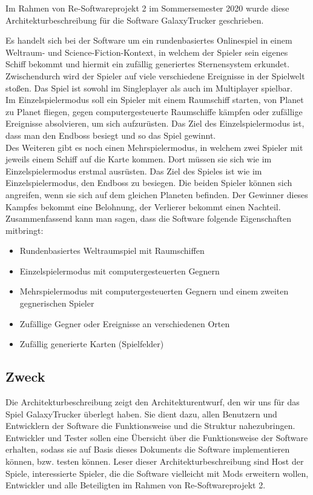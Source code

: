 \documentclass[fontsize=12pt,paper=a4,twoside]{scrartcl}
\begin{document}
Im Rahmen von Re-Softwareprojekt 2 im Sommersemester 2020 wurde diese Architekturbeschreibung für die Software GalaxyTrucker geschrieben.

Es handelt sich bei der Software um ein rundenbasiertes Onlinespiel in einem Weltraum- und Science-Fiction-Kontext, in welchem der Spieler sein eigenes Schiff bekommt und hiermit ein zufällig generiertes Sternensystem erkundet. Zwischendurch wird der Spieler auf viele verschiedene Ereignisse in der Spielwelt stoßen. 
Das Spiel ist sowohl im Singleplayer als auch im Multiplayer spielbar.\\
Im Einzelspielermodus soll ein Spieler mit einem Raumschiff starten, von Planet zu Planet fliegen, gegen computergesteuerte Raumschiffe kämpfen oder zufällige Ereignisse absolvieren, um sich aufzurüsten. Das Ziel des Einzelspielermodus ist, dass man den Endboss besiegt und so das Spiel gewinnt. \\
Des Weiteren gibt es noch einen Mehrspielermodus, in welchem zwei Spieler mit jeweils einem Schiff auf die Karte kommen. Dort müssen sie sich wie im Einzelspielermodus erstmal ausrüsten. Das Ziel des Spieles ist wie im Einzelspielermodus, den Endboss zu besiegen. Die beiden Spieler können sich angreifen, wenn sie sich auf dem gleichen Planeten befinden. Der Gewinner dieses Kampfes bekommt eine Belohnung, der Verlierer bekommt einen Nachteil. 
Zusammenfassend kann man sagen, dass die Software folgende Eigenschaften mitbringt: 

\begin{itemize}
\item{Rundenbasiertes Weltraumspiel mit Raumschiffen}
\item{Einzelspielermodus mit computergesteuerten Gegnern}
\item{Mehrspielermodus mit computergesteuerten Gegnern und einem zweiten gegnerischen Spieler}
\item{Zufällige Gegner oder Ereignisse an verschiedenen Orten}
\item{Zufällig generierte Karten (Spielfelder)}
\end{itemize}



\subsection{Zweck}

Die Architekturbeschreibung zeigt den Architekturentwurf, den wir uns für das Spiel GalaxyTrucker überlegt haben. Sie dient dazu, allen Benutzern und Entwicklern der Software die Funktionsweise und die Struktur nahezubringen. Entwickler und Tester sollen eine Übersicht über die Funktionsweise der Software erhalten, sodass sie auf Basis dieses Dokuments die Software implementieren können, bzw. testen können. 
Leser dieser Architekturbeschreibung sind Host der Spiele, interessierte Spieler, die die Software vielleicht mit Mods erweitern wollen, Entwickler und alle Beteiligten im Rahmen von Re-Softwareprojekt 2. 
\end{document}
